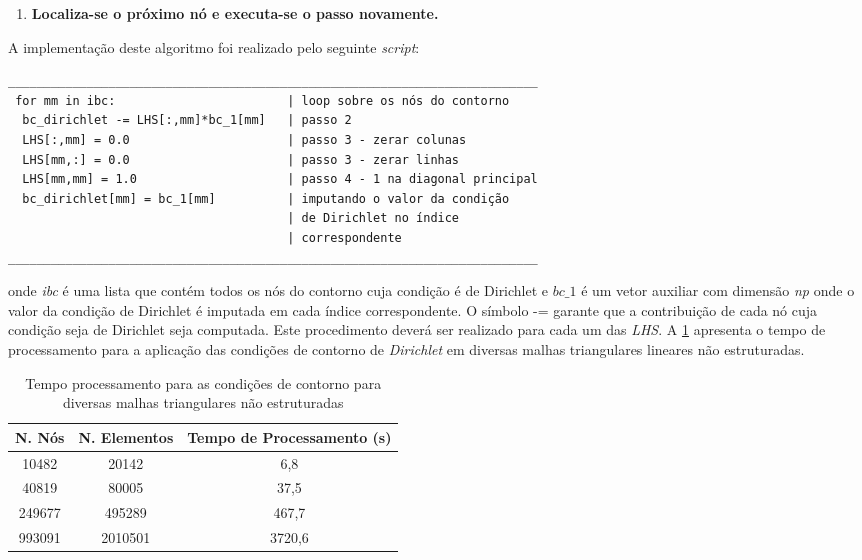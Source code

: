 \begin{enumerate}
 \vspace{0.5cm}
 \item \textbf{Localiza-se o próximo nó e executa-se o passo novamente.}
\end{enumerate}

\newpage
\noindent
A implementação deste algoritmo foi realizado pelo seguinte \textit{script}:
\begin{verbatim}
__________________________________________________________________________
 for mm in ibc:                        | loop sobre os nós do contorno
  bc_dirichlet -= LHS[:,mm]*bc_1[mm]   | passo 2
  LHS[:,mm] = 0.0                      | passo 3 - zerar colunas
  LHS[mm,:] = 0.0                      | passo 3 - zerar linhas
  LHS[mm,mm] = 1.0                     | passo 4 - 1 na diagonal principal
  bc_dirichlet[mm] = bc_1[mm]          | imputando o valor da condição
                                       | de Dirichlet no índice
                                       | correspondente
__________________________________________________________________________
\end{verbatim}

\noindent
onde \textit{ibc} é uma lista que contém todos os nós do contorno
cuja condição é de Dirichlet e
\textit{$bc\_1$} é um vetor auxiliar com dimensão \textit{np}
onde o valor da condição de Dirichlet é imputada em cada índice correspondente.
O símbolo -= garante que a contribuição de cada nó cuja
condição seja de Dirichlet seja computada.
Este procedimento deverá ser realizado para cada um das \textit{LHS}.
A \ref{tempo contorno} apresenta o tempo de processamento para 
a aplicação das condições de contorno de \textit{Dirichlet} em diversas
malhas triangulares lineares não estruturadas.

\vspace{0.5cm}
\begin{table}[H]
\centering
\begin{tabular}{ccc}
\toprule
\textbf{N. Nós} & \textbf{N. Elementos} & \textbf{Tempo de Processamento} (s) \\
\midrule
10482 & 20142 & 6,8 \\
40819 & 80005 & 37,5 \\
249677 & 495289 & 467,7 \\
993091 & 2010501 & 3720,6 \\
\bottomrule
\end{tabular}
\caption{Tempo processamento para as condições de contorno para diversas malhas triangulares não estruturadas}
\label{tempo contorno}
\end{table}
 

